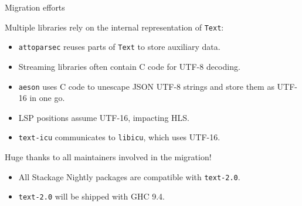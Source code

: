 \documentclass[handout]{beamer}
\begin{document}
\begin{frame}[fragile]{Migration efforts}

Multiple libraries rely on the internal representation of {\tt Text}:

\begin{itemize}
\item {\tt attoparsec} reuses parts of {\tt Text} to store auxiliary data.
\pause
\item Streaming libraries often contain C code for UTF-8 decoding.
\pause
\item {\tt aeson} uses C code to unescape JSON UTF-8 strings
      and store them as UTF-16 in one go.
\pause
\item LSP positions assume UTF-16, impacting HLS.
\pause
\item {\tt text-icu} communicates to {\tt libicu}, which uses UTF-16.
\end{itemize}

\bigskip
\pause

Huge thanks to all maintainers involved in the migration!
\pause

\begin{itemize}
\item All Stackage Nightly packages are compatible with {\tt text-2.0}.
\pause
\item {\tt text-2.0} will be shipped with GHC 9.4.
\end{itemize}

\end{frame}


\end{document}
